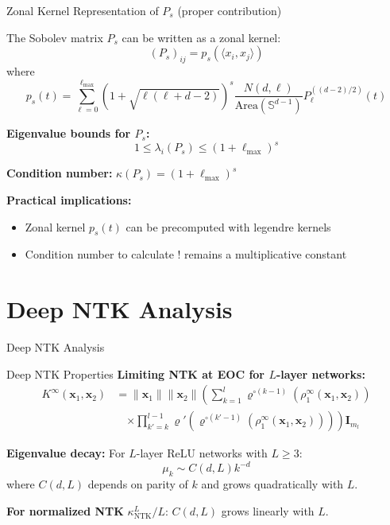 \documentclass{beamer}
\begin{document}
\begin{frame}{Zonal Kernel Representation of $P_s$ (proper contribution)}
  \begin{theorem}
  The Sobolev matrix $P_s$ can be written as a zonal kernel:
  \[ (P_s)_{ij} = p_s(\langle x_i, x_j \rangle) \]
  where
  \[ p_s(t) = \sum_{\ell=0}^{\ell_{\max}} (1 + \sqrt{\ell(\ell + d - 2)})^s \frac{N(d,\ell)}{\text{Area}(\mathbb{S}^{d-1})} P_\ell^{((d-2)/2)}(t) \]
  \end{theorem}
  
  \textbf{Eigenvalue bounds for $P_s$:}
  \[ 1 \leq \lambda_i(P_s) \leq (1 + \ell_{\max})^s \]
  
  \textbf{Condition number:} $\kappa(P_s) = (1 + \ell_{\max})^s$
  
  \textbf{Practical implications:}
  \begin{itemize}
  \item Zonal kernel $p_s(t)$ can be precomputed with legendre kernels
  \item Condition number to calculate ! remains a multiplicative constant

  \end{itemize}
  \end{frame}



\section{Deep NTK Analysis}

\begin{frame}
\begin{center}
\huge{Deep NTK Analysis}
\end{center}
\end{frame}

\begin{frame}{Deep NTK Properties}
\textbf{Limiting NTK at EOC for $L$-layer networks:}
\begin{align*}
K^{\infty}(\mathbf{x}_1, \mathbf{x}_2) &= \|\mathbf{x}_1\| \|\mathbf{x}_2\| \left( \sum_{k=1}^l \varrho^{\circ (k-1)}\left(\rho_1^{\infty}(\mathbf{x}_1, \mathbf{x}_2)\right) \right. \\
&\quad \left. \times \prod_{k'=k}^{l-1} \varrho'\left(\varrho^{\circ (k'-1)}\left(\rho_1^{\infty}(\mathbf{x}_1, \mathbf{x}_2)\right)\right) \right) \mathbf{I}_{m_l}
\end{align*}

\textbf{Eigenvalue decay:} For $L$-layer ReLU networks with $L \geq 3$:
\[ \mu_k \sim C(d, L)k^{-d} \]
where $C(d, L)$ depends on parity of $k$ and grows quadratically with $L$.

\textbf{For normalized NTK} $\kappa^L_{\text{NTK}}/L$: $C(d, L)$ grows linearly with $L$.
\end{frame}
\end{document}
